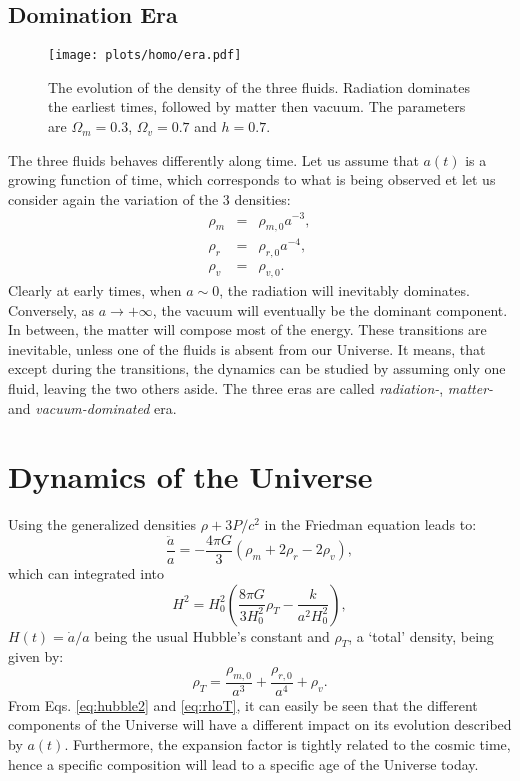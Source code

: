 \subsection{Domination Era} %
\label{sub:domination_era}
\begin{figure}[htbp]
	\centering
		\texttt{[image: plots/homo/era.pdf]}
	\caption{The evolution of the density of the three fluids. Radiation dominates the earliest times, followed by matter then vacuum. The parameters are $\Omega_m=0.3$, $\Omega_v=0.7$ and $h=0.7$.}
	\label{fig:plots_homo_era}
\end{figure}
The three fluids behaves differently along time. Let us assume that $a(t)$ is a growing function of time, which corresponds to what is being observed et let us consider again the variation of the 3 densities:
\begin{eqnarray}
	\rho_m&=&\rho_{m,0}a^{-3},\\
	\rho_r&=&\rho_{r,0}a^{-4},\\
	\rho_v&=&\rho_{v,0}.
\end{eqnarray}
Clearly at early times, when $a\sim 0$, the radiation will inevitably dominates. Conversely, as $a\rightarrow+\infty$, the vacuum will eventually be the dominant component. In between, the matter will compose most of the energy. These transitions are inevitable, unless one of the fluids is absent from our Universe. It means, that except during the transitions, the dynamics can be studied by assuming only one fluid, leaving the two others aside. The three eras are called \emph{radiation-}, \emph{matter-} and \emph{vacuum-dominated} era.

\section{Dynamics of the Universe} %
\label{sec:dynamics_of_the_universe}
Using the generalized densities $\rho+3P/c^2$ in the Friedman equation leads to:
\begin{equation}
	\frac{\ddot a}{a}=-\frac{4\pi G}{3}(\rho_m+2\rho_r-2\rho_v),
\end{equation}
which can integrated into
\begin{equation}
	H^2=H_0^2(\frac{8\pi G}{3H_0^2}\rho_T-\frac{k}{a^2H_0^2}),
	\label{eq:hubble2}
\end{equation}
$H(t)=\dot a /a$ being the usual Hubble's constant and $\rho_T$, a `total' density, being given by:
\begin{equation}
	\rho_T=\frac{\rho_{m,0}}{a^3}+\frac{\rho_{r,0}}{a^4}+\rho_{v}.
	\label{eq:rhoT}
\end{equation} 
From Eqs. \ref{eq:hubble2} and \ref{eq:rhoT}, it can easily be seen that the different components of the Universe will have a different impact on its evolution described by $a(t)$. Furthermore, the expansion factor is tightly related to the cosmic time, hence a specific composition will lead to a specific age of the Universe today. 

